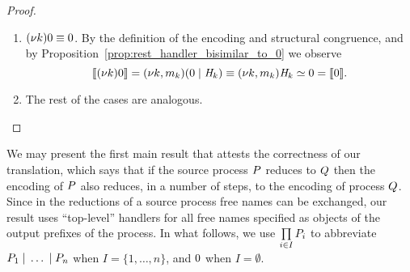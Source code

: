 \begin{proof}
\begin{enumerate}
\item $(\nu k)0 \equiv 0$. By the definition of the encoding and structural congruence, and by Proposition~\ref{prop:rest_handler_bisimilar_to_0} we observe
\[
\llbracket (\nu k)0 \rrbracket  = 
(\nu k,  m_k)(0 \;|\; \mathit{H}_k) 
 \equiv  (\nu k, m_k)\mathit{H}_k 
\simeq  0= \llbracket 0 \rrbracket.
\]

\item The rest of the cases are analogous.
\end{enumerate}
\end{proof}
%


%
We may present the first main result that attests the correctness of our translation, which says that if the source process $P$ reduces to $Q$ then the encoding of $P$ also reduces, in a number of steps, to the encoding of process $Q$. Since in the reductions of a source process free names can be exchanged, our result uses ``top-level'' handlers for all free names specified as objects of the output prefixes of the process. 
In what follows, we use $\prod\limits_{i\in I} P_i$ to abbreviate $P_1 \;|\; \ldots \;|\; P_n$ when $I=\{1, \ldots, n\}$, and $0$ when $I=\emptyset$.


